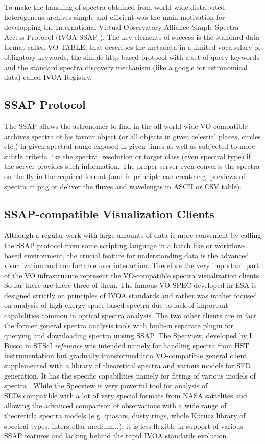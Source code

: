 \documentclass[final,authoryear,5p,times,twocolumn]{elsarticle}
\begin{document}
To make the handling of spectra obtained from world-wide  distributed
heterogeneus archives simple and efficient was the main motivation for
developping the International Virtual Observatory Alliance Simple Spectra
Access Protocol (IVOA SSAP \cite{ssap}). The key elements of success is the standard data
format called VO-TABLE, that describes the metadata in a limited vocabulary of
obligatory keywords, the simple http-based protocol with a set of query keywords
and the standard spectra discovery mechanism (like a google for astronomical
data) called IVOA Registry.


\subsection{SSAP Protocol}


The SSAP allows the astronomer to find in the all world-wide VO-compatible
archives spectra of his favour object (or all objects in given celestial
places, circles etc.) in given spectral range exposed in given times as well as
subjected to more subtle criteria like the spectral resolution or target class
(even spectral type) if the server provides such information.  The proper
server even converts the spectra on-the-fly in the required format (and in
principle can create e.g. previews of spectra in png or deliver the fluxes and
wavelengts in ASCII or CSV table).

\subsection{SSAP-compatible  Visualization Clients}


Although a regular work with large amounts of data is more convenient by
calling the SSAP protocol from some scripting language in a batch like or
workflow-based environment, the crucial feature for understanding data is the
advanced visualization and comfortable user interaction.   Therefore the very
important part of the VO infrastrucure represent the VO-compatible spectra
visualization clients.  So far there are there three of them. The famous
VO-SPEC developed in ESA is designed strictly on principles of IVOA standards
and rather was irather focused on analysis of high energy space-based spectra
due to lack of important capabilities common in optical spectra analysis.  The
two other clients are in fact the former general spectra  analysis tools with
built-in separate plugin for querying and downloading spectra uusing SSAP.  The
Specview, developed by I. Busco in STScI {\it reference}  was  intended namely for
handling spectra from HST instrumentation but gradually transformed into
VO-compatible general client supplemented with a library of theoretical spectra
and various models for SED  generation.  It has the specific capabilities
namely for fitting of various models of spectra . While the Specview is very
powerful tool for analysis of SEDs,compatible with a lot of very special
formats from NASA sattelites and allowing the advanced comparison of
observations with a wide range of theoreticla spectra models  (e.g. quasars,
dusty rings, whole Kurucz library of spectral types, interstellar medium...),
it is less flexible in support of various SSAP features and lacking behind the
rapid IVOA standards evolution. 
\end{document}
